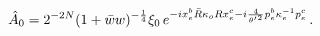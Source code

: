 \begin{equation}
\hat{A}_0=2^{-2N}(1+\bar{w}w)^{-{1\over 4}}\xi_0\,
e^{-ix_{e}^{b}\bar{R}\kappa _{o}Rx_{e}^{c}
-i{\frac{4}{{\theta ^{\prime }}^{2}}}p_{e}^{b}\kappa _{e}^{-1}p_{e}^{c}}\,.
\end{equation}

